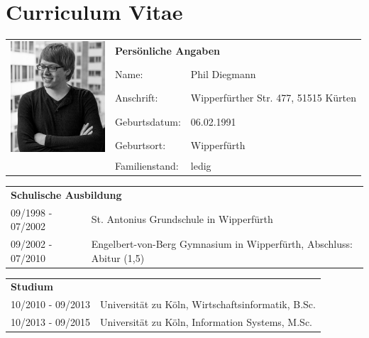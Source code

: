 \section*{\hspace{0.2cm}Curriculum Vitae} 

\begin{flushleft}

\begin{tabular}{p{11em} p{10em} p{10em}}
    \multirow{5}{*}{\includegraphics[width=9.5em]{figures/passfoto.jpg}} &     \multicolumn{2}{l}{\textbf{Persönliche Angaben}} \\
    & Name: & Phil Diegmann \\
    & Anschrift: & Wipperfürther Str. 477, 51515 Kürten \\
    & Geburtsdatum: & 06.02.1991 \\
    & Geburtsort: & Wipperfürth \\
    & Familienstand: & ledig \\
\end{tabular}

\vspace{0.5em}

\begin{tabular}{p{11em} p{22.5em}}
    \multicolumn{2}{l}{\textbf{Schulische Ausbildung}} \\
    09/1998 - 07/2002 & St. Antonius Grundschule in Wipperfürth \\
    09/2002 - 07/2010 & Engelbert-von-Berg Gymnasium in Wipperfürth, Abschluss: Abitur (1,5) \\
\end{tabular}

\vspace{0.5em}

\begin{tabular}{p{11em} p{22.5em}}
    \multicolumn{2}{l}{\textbf{Studium}} \\
    10/2010 - 09/2013 & Universität zu Köln, Wirtschaftsinformatik, B.Sc. \\
    10/2013 - 09/2015 & Universität zu Köln, Information Systems, M.Sc.\\
\end{tabular}


\end{flushleft}
